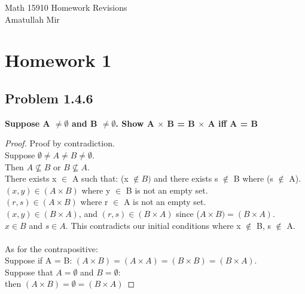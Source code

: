 \documentclass[12pt]{article}
\theoremstyle{definition}
\numberwithin{equation}{subsection}
\begin{document}
\pagestyle{plain}



\begin{center}
{\large Math 15910 Homework Revisions} \\ 
{\medium Amatullah Mir} 
\vspace{.1 in}  
\end{center}

\section{Homework 1}

\subsection{Problem 1.4.6}
\textbf{Suppose A $\neq \emptyset$ and B $\neq \emptyset$. Show A $\times$ B = B $\times$ A iff A = B}
\begin{proof}
Proof by contradiction. \\
Suppose $\emptyset \neq A \neq B \neq \emptyset$. \\
Then $A \nsubseteq B$ or $B \nsubseteq A.$
\\ There exists x $\in$ A such that: (x $\notin B)$ and there exists s $\notin$ B where (s $\notin$ A).
\\
$(x,y) \in (A \times B)$ where y $\in$ B is not an empty set.\\ $(r,s) \in (A \times B)$ where r $\in$ A is not an empty set.
\\ 
$(x,y) \in (B \times A)$, and $(r,s) \in (B \times A)$ since ($A \times B) = (B \times A).$
\\
$x \in B$ and $s \in A$. This contradicts our initial conditions where x $\notin$ B, s $\notin$ A.
\\
\\
As for the contrapositive: \\
Suppose if A = B:
$(A \times B) = (A \times A) = (B \times B) = (B \times A)$.\\
Suppose that $A = \emptyset$ and $B = \emptyset:$
\\ then $(A \times B) = \emptyset = (B \times A)$
\end{proof}
\end{document}
